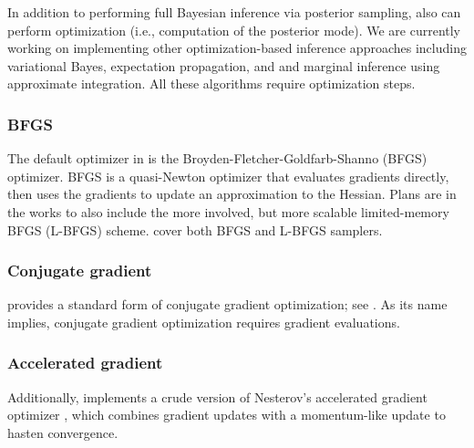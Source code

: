 \documentclass[article]{jss}
\begin{document}
In addition to performing full Bayesian inference via posterior
sampling,  also can perform optimization (i.e., computation of the
posterior mode).  We are currently working on implementing other
optimization-based inference approaches including variational Bayes,
expectation propagation, and and marginal inference using approximate
integration.  All these algorithms require optimization steps.

\subsubsection{BFGS}

The default optimizer in  is the
Broyden-Fletcher-Goldfarb-Shanno (BFGS) optimizer.  BFGS is a
quasi-Newton optimizer that evaluates gradients directly, then uses
the gradients to update an approximation to the Hessian.  Plans are in
the works to also include the more involved, but more scalable
limited-memory BFGS (L-BFGS) scheme.  \citet{NocedalWright:2006} cover
both BFGS and L-BFGS samplers.

\subsubsection{Conjugate gradient}

 provides a standard form of conjugate gradient
optimization; see \citep{NocedalWright:2006}.  As its name implies,
conjugate gradient optimization requires gradient evaluations.

\subsubsection{Accelerated gradient}

Additionally,  implements a crude version of Nesterov's
accelerated gradient optimizer \cite{Nesterov:1983}, which combines
gradient updates with a momentum-like update to hasten convergence.


\end{document}

